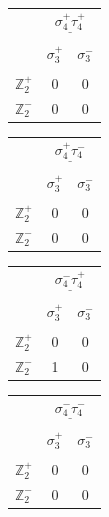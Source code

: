 \documentclass[11pt]{article}
\begin{document}
\begin{table}
\begin{center}
\begin{tabular}{ c | c | c |}
\multicolumn{1}{c}{} &\multicolumn{2}{c}{$\underline{\ \sigma_4^+ \tau_4^+ \ }$} \\[-1em]
\multicolumn{1}{c}{} & \multicolumn{1}{c}{} & \multicolumn{1}{c}{} \\
 & $\sigma_{3}^+$ & \multicolumn{1}{c}{$\sigma_{3}^-$} \\[-1em]
 &  & \multicolumn{1}{c}{} \\
\cline{1-3} $\mathbb{Z}_2^+$ & 0 & \multicolumn{1}{c}{0} \\
\cline{1-3} $\mathbb{Z}_2^-$ & 0 & \multicolumn{1}{c}{0} 
\end{tabular} 
\hspace{.6cm}
\begin{tabular}{ c | c | c |}
\multicolumn{1}{c}{} &\multicolumn{2}{c}{$\underline{\ \sigma_4^+ \tau_4^- \ }$} \\[-1em]
\multicolumn{1}{c}{} & \multicolumn{1}{c}{} & \multicolumn{1}{c}{}\\
 & $\sigma_{3}^+$ & \multicolumn{1}{c}{$\sigma_{3}^-$} \\[-1em]
 & & \multicolumn{1}{c}{} \\
\cline{1-3} $\mathbb{Z}_2^+$ & 0 & \multicolumn{1}{c}{0} \\
\cline{1-3} $\mathbb{Z}_2^-$ & 0 & \multicolumn{1}{c}{0}
\end{tabular}
\hspace{.6cm}
\begin{tabular}{ c | c | c |}
\multicolumn{1}{c}{} &\multicolumn{2}{c}{$\underline{\ \sigma_4^- \tau_4^+ \ }$} \\[-1em]
\multicolumn{1}{c}{} & \multicolumn{1}{c}{} & \multicolumn{1}{c}{}\\
 & $\sigma_{3}^+$ & \multicolumn{1}{c}{$\sigma_{3}^-$} \\[-1em]
 & & \multicolumn{1}{c}{} \\
\cline{1-3} $\mathbb{Z}_2^+$ & 0 & \multicolumn{1}{c}{0} \\
\cline{1-3} $\mathbb{Z}_2^-$ & 1 & \multicolumn{1}{c}{0} 
\end{tabular}
\hspace{.6cm}
\begin{tabular}{ c | c | c |}
\multicolumn{1}{c}{} &\multicolumn{2}{c}{$\underline{\ \sigma_4^- \tau_4^- \ }$} \\[-1em]
\multicolumn{1}{c}{} & \multicolumn{1}{c}{} & \multicolumn{1}{c}{}\\
 & $\sigma_{3}^+$ & \multicolumn{1}{c}{$\sigma_{3}^-$} \\[-1em]
 & & \multicolumn{1}{c}{} \\
\cline{1-3} $\mathbb{Z}_2^+$ & 0 & \multicolumn{1}{c}{0} \\
\cline{1-3} $\mathbb{Z}_2^-$ & 0 & \multicolumn{1}{c}{0} 
\end{tabular}


\end{center}
\end{table}
\end{document}
